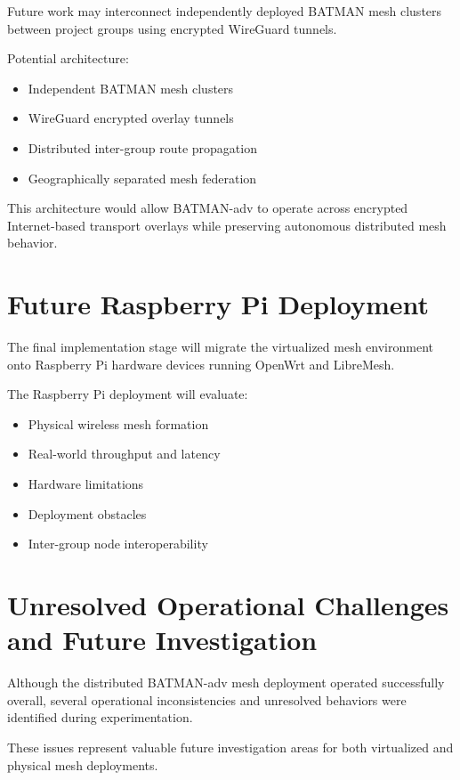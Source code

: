\documentclass[conference]{IEEEtran}
\begin{document}
Future work may interconnect independently deployed BATMAN mesh clusters between project groups using encrypted WireGuard tunnels.

Potential architecture:

\begin{itemize}
    \item Independent BATMAN mesh clusters
    \item WireGuard encrypted overlay tunnels
    \item Distributed inter-group route propagation
    \item Geographically separated mesh federation
\end{itemize}

This architecture would allow BATMAN-adv to operate across encrypted Internet-based transport overlays while preserving autonomous distributed mesh behavior.

\section{Future Raspberry Pi Deployment}

The final implementation stage will migrate the virtualized mesh environment onto Raspberry Pi hardware devices running OpenWrt and LibreMesh.

The Raspberry Pi deployment will evaluate:

\begin{itemize}
    \item Physical wireless mesh formation
    \item Real-world throughput and latency
    \item Hardware limitations
    \item Deployment obstacles
    \item Inter-group node interoperability
\end{itemize}

\section{Unresolved Operational Challenges and Future Investigation}

Although the distributed BATMAN-adv mesh deployment operated successfully overall, several operational inconsistencies and unresolved behaviors were identified during experimentation.

These issues represent valuable future investigation areas for both virtualized and physical mesh deployments.
\end{document}
